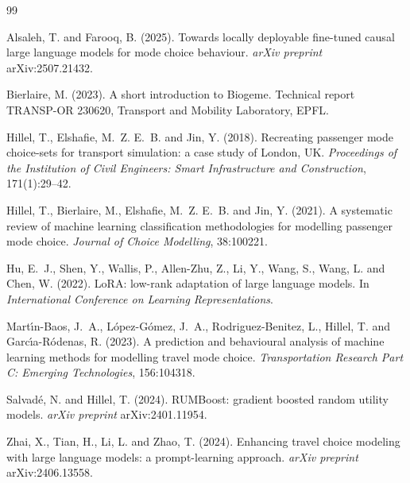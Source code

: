 \documentclass[11pt,a4paper]{article}
\begin{document}
\begin{thebibliography}{99}
\setlength{\itemsep}{0.2em}

Alsaleh, T. and Farooq, B. (2025).
\newblock Towards locally deployable fine-tuned causal large language models for mode choice behaviour.
\newblock \emph{arXiv preprint} arXiv:2507.21432.

Bierlaire, M. (2023).
\newblock A short introduction to Biogeme.
\newblock Technical report TRANSP-OR 230620, Transport and Mobility Laboratory, EPFL.

Hillel, T., Elshafie, M.~Z. E.~B. and Jin, Y. (2018).
\newblock Recreating passenger mode choice-sets for transport simulation: a case study of London, UK.
\newblock \emph{Proceedings of the Institution of Civil Engineers: Smart Infrastructure and Construction}, 171(1):29--42.

Hillel, T., Bierlaire, M., Elshafie, M.~Z. E.~B. and Jin, Y. (2021).
\newblock A systematic review of machine learning classification methodologies for modelling passenger mode choice.
\newblock \emph{Journal of Choice Modelling}, 38:100221.

Hu, E.~J., Shen, Y., Wallis, P., Allen-Zhu, Z., Li, Y., Wang, S., Wang, L. and Chen, W. (2022).
\newblock LoRA: low-rank adaptation of large language models.
\newblock In \emph{International Conference on Learning Representations}.

Mart{\'\i}n-Baos, J.~A., L{\'o}pez-G{\'o}mez, J.~A., Rodriguez-Benitez, L., Hillel, T. and Garc{\'\i}a-R{\'o}denas, R. (2023).
\newblock A prediction and behavioural analysis of machine learning methods for modelling travel mode choice.
\newblock \emph{Transportation Research Part C: Emerging Technologies}, 156:104318.

Salvad{\'e}, N. and Hillel, T. (2024).
\newblock RUMBoost: gradient boosted random utility models.
\newblock \emph{arXiv preprint} arXiv:2401.11954.

Zhai, X., Tian, H., Li, L. and Zhao, T. (2024).
\newblock Enhancing travel choice modeling with large language models: a prompt-learning approach.
\newblock \emph{arXiv preprint} arXiv:2406.13558.

\end{thebibliography}
\end{document}
